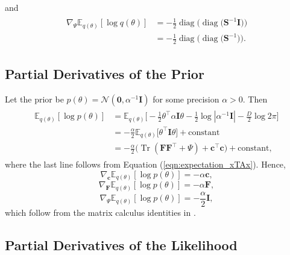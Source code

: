 \documentclass[msc,deptreport.inf]{infthesis} %
\newcommand{\matr}[1]{\mathbf{#1}}
\newcommand{\E}{\mathbb E}
\newcommand{\diag}{\mathop{\mathrm{diag}}}
\newcommand{\tr}{\mathop{\mathrm{Tr}}}
\begin{document}
and
\begin{align}
\begin{split}\label{eqn:grad_vi_dist_wrt_Psi}
	\nabla_\Psi \E_{q(\theta)} [\log q(\theta)]
	& = -\frac{1}{2} \diag\big(\diag\big(\matr{S}^{-1} \matr{I}\big)\big) \\
	& = -\frac{1}{2} \diag\big(\diag\big(\matr{S}^{-1}\big)\big).
\end{split}
\end{align}

\subsection{Partial Derivatives of the Prior}

Let the prior be $p(\theta) = \mathcal{N}(\matr{0}, \alpha^{-1} \matr{I})$ for some precision $\alpha > 0$. Then
\begin{align}
\begin{split}
	\E_{q(\theta)} [\log p(\theta)]
	& = \E_{q(\theta)} \Big[-\frac{1}{2} \theta^\intercal \alpha \matr{I} \theta  - \frac{1}{2} \log |\alpha^{-1} \matr{I}| - \frac{D}{2} \log 2\pi\Big] \\
	& = -\frac{\alpha}{2} \E_{q(\theta)} \Big[ \theta^\intercal \matr{I} \theta \Big] + \text{constant} \\
	& = -\frac{\alpha}{2}\big( \tr(\matr{FF}^{\intercal} + \Psi) + \matr{c}^\intercal \matr{c} \big)+ \text{constant},
\end{split}
\end{align}
where the last line follows from Equation (\ref{eqn:expectation_xTAx}). Hence, 
\begin{equation}
	\nabla_\matr{c} \E_{q(\theta)} [\log p(\theta)] = -\alpha \matr{c},
\end{equation}
\begin{equation}
	\nabla_\matr{F} \E_{q(\theta)} [\log p(\theta)] = -\alpha \matr{F},
\end{equation}
\begin{equation}\label{eqn:grad_prior_wrt_psi}
	\nabla_\Psi \E_{q(\theta)} [\log p(\theta)] = -\frac{\alpha}{2} \matr{I},
\end{equation}
which follow from the matrix calculus identities in \cite{petersen2012}.

\subsection{Partial Derivatives of the Likelihood}
\end{document}

